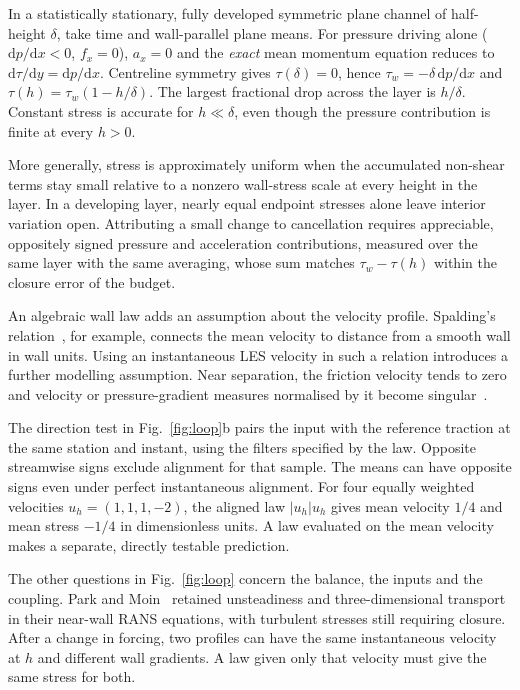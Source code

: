 \documentclass[pdflatex,sn-nature,iicol]{sn-jnl}
\begin{document}
In a statistically stationary, fully developed symmetric plane channel of half-height $\delta$, take time and wall-parallel plane means. For pressure driving alone ($\mathrm{d}p/\mathrm{d}x<0$, $f_x=0$), $a_x=0$ and the \emph{exact} mean momentum equation reduces to $\mathrm{d}\tau/\mathrm{d}y=\mathrm{d}p/\mathrm{d}x$. Centreline symmetry gives $\tau(\delta)=0$, hence $\tau_w=-\delta\,\mathrm{d}p/\mathrm{d}x$ and $\tau(h)=\tau_w(1-h/\delta)$. The largest fractional drop across the layer is $h/\delta$. Constant stress is accurate for $h\ll\delta$, even though the pressure contribution is finite at every $h>0$.

More generally, stress is approximately uniform when the accumulated non-shear terms stay small relative to a nonzero wall-stress scale at every height in the layer. In a developing layer, nearly equal endpoint stresses alone leave interior variation open. Attributing a small change to cancellation requires appreciable, oppositely signed pressure and acceleration contributions, measured over the same layer with the same averaging, whose sum matches $\tau_w-\tau(h)$ within the closure error of the budget.

An algebraic wall law adds an assumption about the velocity profile. Spalding's relation~\cite{Spalding1961}, for example, connects the mean velocity to distance from a smooth wall in wall units. Using an instantaneous LES velocity in such a relation introduces a further modelling assumption. Near separation, the friction velocity tends to zero and velocity or pressure-gradient measures normalised by it become singular~\cite{BosePark2018}.

The direction test in Fig.~\ref{fig:loop}b pairs the input with the reference traction at the same station and instant, using the filters specified by the law. Opposite streamwise signs exclude alignment for that sample. The means can have opposite signs even under perfect instantaneous alignment. For four equally weighted velocities $u_h=(1,1,1,-2)$, the aligned law $|u_h|u_h$ gives mean velocity $1/4$ and mean stress $-1/4$ in dimensionless units. A law evaluated on the mean velocity makes a separate, directly testable prediction.

The other questions in Fig.~\ref{fig:loop} concern the balance, the inputs and the coupling. Park and Moin~\cite{ParkMoin2014} retained unsteadiness and three-dimensional transport in their near-wall RANS equations, with turbulent stresses still requiring closure. After a change in forcing, two profiles can have the same instantaneous velocity at $h$ and different wall gradients. A law given only that velocity must give the same stress for both.
\end{document}

